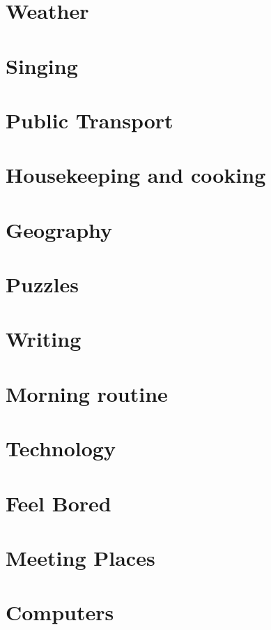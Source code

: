 \documentclass[conference]{IEEEtran}
\begin{document}
\section{Weather}

\section{Singing}

\section{Public Transport}

\section{Housekeeping and cooking}

\section{Geography}

\section{Puzzles}

\section{Writing}

\section{Morning routine}

\section{Technology}

\section{Feel Bored}

\section{Meeting Places}

\section{Computers}
\end{document}
